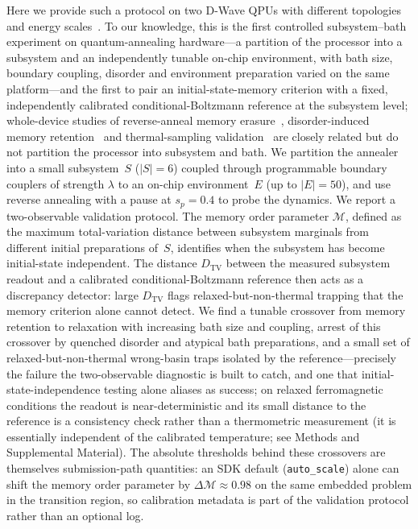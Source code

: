 \documentclass[aps,prapplied,reprint,superscriptaddress,floatfix,nofootinbib]{revtex4-2}
\begin{document}
Here we provide such a protocol on two D-Wave QPUs with different topologies and energy scales~\cite{king2022coherent,king2023critical,mehta2025unraveling,mehta2025dwave}.
To our knowledge, this is the first controlled subsystem--bath experiment on quantum-annealing hardware---a partition of the processor into a subsystem and an independently tunable on-chip environment, with bath size, boundary coupling, disorder and environment preparation varied on the same platform---and the first to pair an initial-state-memory criterion with a fixed, independently calibrated conditional-Boltzmann reference at the subsystem level; whole-device studies of reverse-anneal memory erasure~\cite{pelofske2025erasing}, disorder-induced memory retention~\cite{dacafilho2022localization} and thermal-sampling validation~\cite{izquierdo2021thermal,nelson2022gibbs,vuffray2022boltzmann} are closely related but do not partition the processor into subsystem and bath.
We partition the annealer into a small subsystem~$S$ ($|S|=6$) coupled through programmable boundary couplers of strength $\lambda$ to an on-chip environment~$E$ (up to $|E|=50$), and use reverse annealing with a pause at $s_p=0.4$ to probe the dynamics.
We report a two-observable validation protocol.
The memory order parameter $\mathcal{M}$, defined as the maximum total-variation distance between subsystem marginals from different initial preparations of~$S$, identifies when the subsystem has become initial-state independent.
The distance $D_\mathrm{TV}$ between the measured subsystem readout and a calibrated conditional-Boltzmann reference then acts as a discrepancy detector: large $D_\mathrm{TV}$ flags relaxed-but-non-thermal trapping that the memory criterion alone cannot detect.
We find a tunable crossover from memory retention to relaxation with increasing bath size and coupling, arrest of this crossover by quenched disorder and atypical bath preparations, and a small set of relaxed-but-non-thermal wrong-basin traps isolated by the reference---precisely the failure the two-observable diagnostic is built to catch, and one that initial-state-independence testing alone aliases as success; on relaxed ferromagnetic conditions the readout is near-deterministic and its small distance to the reference is a consistency check rather than a thermometric measurement (it is essentially independent of the calibrated temperature; see Methods and Supplemental Material).
The absolute thresholds behind these crossovers are themselves submission-path quantities: an SDK default (\texttt{auto\_scale}) alone can shift the memory order parameter by $\Delta\mathcal{M}\approx 0.98$ on the same embedded problem in the transition region, so calibration metadata is part of the validation protocol rather than an optional log.
\end{document}
